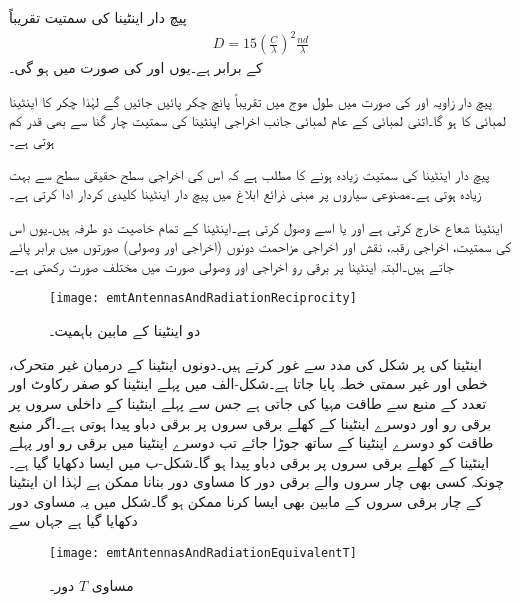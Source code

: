 پیچ دار اینٹینا کی سمتیت تقریباً
\begin{align}
D=15 \left(\frac{C}{\lambda}\right)^2 \frac{n d}{\lambda}
\end{align}
کے برابر ہے۔یوں  اور  کی صورت میں  ہو گی۔

پیچ دار زاویہ  اور  کی صورت میں طول موج میں تقریباً پانچ چکر پائیں جائیں گے لہٰذا  چکر کا
 اینٹینا  لمبائی کا ہو گا۔اتنی لمبائی کے عام لمبائی جانب اخراجی اینٹینا کی سمتیت چار گنا سے بھی قدر کم ہوتی ہے۔

پیچ دار اینٹینا کی سمتیت زیادہ ہونے کا مطلب ہے کہ اس کی اخراجی سطح حقیقی سطح سے بہت زیادہ ہوتی ہے۔مصنوعی سیاروں پر مبنی ذرائع ابلاغ میں پیچ دار اینٹینا کلیدی کردار ادا کرتی ہے۔ 

اینٹینا شعاع خارج کرتی ہے اور یا اسے وصول کرتی ہے۔اینٹینا کے تمام خاصیت دو طرفہ ہیں۔یوں اس کی سمتیت، اخراجی رقبہ، نقش اور اخراجی مزاحمت دونوں (اخراجی اور وصولی) صورتوں  میں برابر پائے جاتے ہیں۔البتہ اینٹینا پر برقی رو اخراجی اور وصولی صورت میں مختلف صورت رکھتی ہے۔

\begin{figure}
\centering
\texttt{[image: emtAntennasAndRadiationReciprocity]}
\caption{دو اینٹینا کے مابین باہمیت۔}
\label{شکل_اینٹینا_باہمیت}
\end{figure}
اینٹینا کی  پر شکل  کی مدد سے غور کرتے ہیں۔دونوں اینٹینا کے درمیان غیر متحرک، خطی اور غیر سمتی خطہ پایا جاتا ہے۔شکل-الف میں پہلے اینٹینا کو صفر رکاوٹ اور  تعدد کے منبع سے طاقت مہیا کی جاتی ہے جس سے پہلے اینٹینا کے داخلی سروں پر  برقی رو اور دوسرے اینٹینا کے کھلے برقی سروں پر برقی دباو  پیدا ہوتی ہے۔اگر منبع طاقت کو دوسرے اینٹینا کے ساتھ جوڑا جائے تب دوسرے اینٹینا میں  برقی رو اور پہلے اینٹینا کے کھلے برقی سروں پر  برقی دباو پیدا ہو گا۔شکل-ب میں ایسا دکھایا گیا ہے۔چونکہ کسی بھی چار سروں والے برقی دور کا مساوی  دور بنانا ممکن ہے لہٰذا ان اینٹینا کے چار برقی سروں کے مابین بھی ایسا کرنا ممکن ہو گا۔شکل  میں یہ مساوی دور دکھایا گیا ہے جہاں سے

\begin{figure}
\centering
\texttt{[image: emtAntennasAndRadiationEquivalentT]}
\caption{مساوی $T$ دور۔}
\label{شکل_اینٹینا_مساوی_ٹی_دور}
\end{figure}

